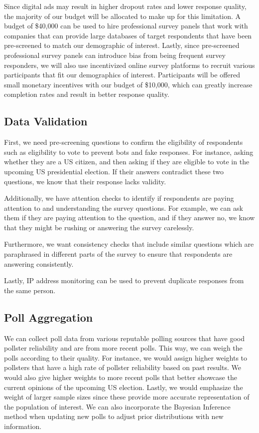 \documentclass[
  letterpaper,
  DIV=11,
  numbers=noendperiod]{scrartcl}
\begin{document}
Since digital ads may result in higher dropout rates and lower response
quality, the majority of our budget will be allocated to make up for
this limitation. A budget of \$40,000 can be used to hire professional
survey panels that work with companies that can provide large databases
of target respondents that have been pre-screened to match our
demographic of interest. Lastly, since pre-screened professional survey
panels can introduce bias from being frequent survey responders, we will
also use incentivized online survey platforms to recruit various
participants that fit our demographics of interest. Participants will be
offered small monetary incentives with our budget of \$10,000, which can
greatly increase completion rates and result in better response quality.

\subsection{Data Validation}\label{data-validation}

First, we need pre-screening questions to confirm the eligibility of
respondents such as eligibility to vote to prevent bots and fake
responses. For instance, asking whether they are a US citizen, and then
asking if they are eligible to vote in the upcoming US presidential
election. If their answers contradict these two questions, we know that
their response lacks validity.

Additionally, we have attention checks to identify if respondents are
paying attention to and understanding the survey questions. For example,
we can ask them if they are paying attention to the question, and if
they answer no, we know that they might be rushing or answering the
survey carelessly.

Furthermore, we want consistency checks that include similar questions
which are paraphrased in different parts of the survey to ensure that
respondents are answering consistently.

Lastly, IP address monitoring can be used to prevent duplicate responses
from the same person.

\subsection{Poll Aggregation}\label{poll-aggregation}

We can collect poll data from various reputable polling sources that
have good pollster reliability and are from more recent polls. This way,
we can weigh the polls according to their quality. For instance, we
would assign higher weights to pollsters that have a high rate of
pollster reliability based on past results. We would also give higher
weights to more recent polls that better showcase the current opinions
of the upcoming US election. Lastly, we would emphasize the weight of
larger sample sizes since these provide more accurate representation of
the population of interest. We can also incorporate the Bayesian
Inference method when updating new polls to adjust prior distributions
with new information.
\end{document}
